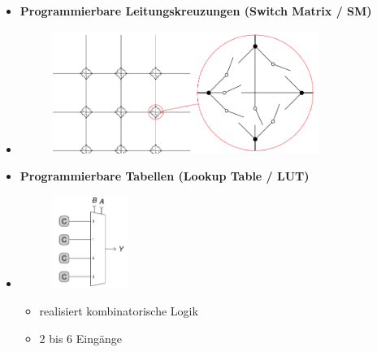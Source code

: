 \documentclass[11pt,a4paper]{article}
\begin{document}
\begin{itemize}
\pagebreak

\item \textbf{Programmierbare Leitungskreuzungen (Switch Matrix / SM)}
\item[]
			\begin{figure}[H]
			\begin{center}
			\includegraphics[height=4cm]{Bilder/switchmatrix}
			\end{center}
			\end{figure}
			
\item \textbf{Programmierbare Tabellen (Lookup Table / LUT)}
\item[]
		\begin{minipage}{0.3\textwidth}
				\begin{figure}[H]
				\includegraphics[height=3cm]{Bilder/lookuptable}
				\end{figure}
			\end{minipage}
			\begin{minipage}[t]{0.5\textwidth}
				\vspace{-1.25cm}
				\begin{itemize}
				\item realisiert kombinatorische Logik
				\item 2 bis 6 Eingänge
				\end{itemize}
			\end{minipage}
			

\end{itemize}
\end{document}
